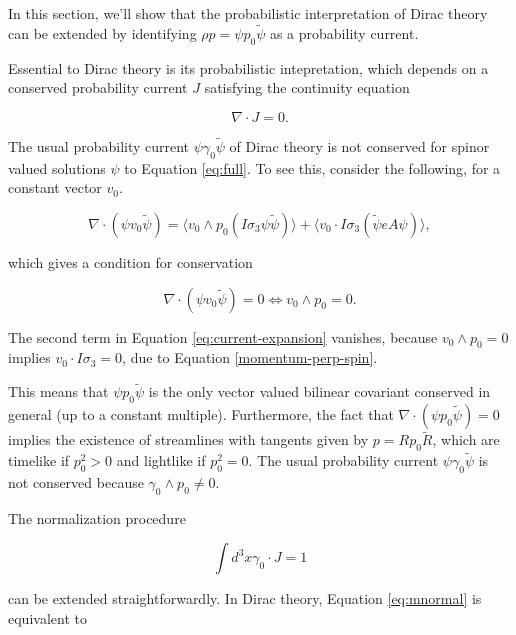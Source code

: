 \documentclass{article}
\begin{document}
  In this section, we'll show that the probabilistic interpretation of Dirac theory can be extended by identifying $\rho p = \psi p_0 \widetilde \psi$ as a probability current.

  Essential to Dirac theory is its probabilistic intepretation, which depends on a conserved probability current $J$ satisfying the continuity equation

  \begin{equation}
    \nabla \cdot J = 0.
  \end{equation}

  The usual probability current $\psi \gamma_0 \widetilde \psi$ of Dirac theory is not conserved for spinor valued solutions $\psi$ to Equation \ref{eq:full}. To see this, consider the following, for a constant vector $v_0$.

  \begin{equation}
    \nabla \cdot (\psi v_0 \widetilde \psi) = \langle v_0 \wedge p_0 (I \sigma_3 \psi \widetilde \psi) \rangle + \langle v_0 \cdot I \sigma_3 (\widetilde \psi e A \psi) \rangle,\label{eq:current-expansion}
  \end{equation}

  which gives a condition for conservation

  \begin{equation}
    \nabla \cdot (\psi v_0 \widetilde \psi) = 0 \iff v_0 \wedge p_0 = 0.
  \end{equation}

  The second term in Equation \ref{eq:current-expansion} vanishes, because $v_0 \wedge p_0 = 0$ implies $v_0 \cdot I \sigma_3 = 0$, due to Equation \ref{momentum-perp-spin}.

  This means that $\psi p_0 \widetilde \psi$ is the only vector valued bilinear covariant conserved in general (up to a constant multiple). Furthermore, the fact that $\nabla \cdot (\psi p_0 \widetilde \psi) = 0$ implies the existence of streamlines with tangents given by $p = R p_0 \widetilde R$, which are timelike if $p_0^2 > 0$ and lightlike if $p_0^2 = 0$.\cite{hestenes} The usual probability current $\psi \gamma_0 \widetilde \psi$ is not conserved because $\gamma_0 \wedge p_0 \not= 0$.

  The normalization procedure

  \begin{equation}
    \int d^3x \gamma_0 \cdot J = 1\label{eq:mnormal}
  \end{equation}

  can be extended straightforwardly. In Dirac theory, Equation \ref{eq:mnormal} is equivalent to
\end{document}
